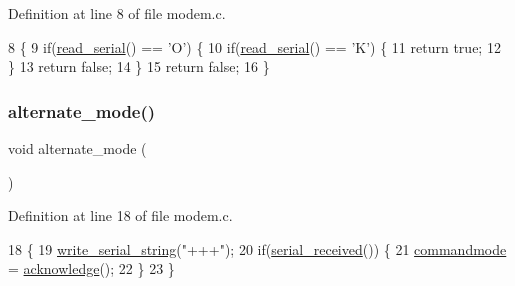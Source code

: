 Definition at line 8 of file modem.\+c.


\begin{DoxyCode}
8                    \{
9     \textcolor{keywordflow}{if}(\hyperlink{a00050_ad343a7018f74662f794968dfa0523841_ad343a7018f74662f794968dfa0523841}{read\_serial}() == \textcolor{charliteral}{'O'}) \{
10         \textcolor{keywordflow}{if}(\hyperlink{a00050_ad343a7018f74662f794968dfa0523841_ad343a7018f74662f794968dfa0523841}{read\_serial}() == \textcolor{charliteral}{'K'}) \{
11             \textcolor{keywordflow}{return} \textcolor{keyword}{true};
12         \}
13         \textcolor{keywordflow}{return} \textcolor{keyword}{false};
14     \}
15     \textcolor{keywordflow}{return} \textcolor{keyword}{false};
16 \}
\end{DoxyCode}
\mbox{\label{a00041_ace378eaa88c0b7f0cdafe97d064e36fb_ace378eaa88c0b7f0cdafe97d064e36fb}} 
\subsubsection{\texorpdfstring{alternate\+\_\+mode()}{alternate\_mode()}}
{\footnotesize\ttfamily void alternate\+\_\+mode (\begin{DoxyParamCaption}{ }\end{DoxyParamCaption})}



Definition at line 18 of file modem.\+c.


\begin{DoxyCode}
18                       \{
19     \hyperlink{a00050_aabbe45d6670f606c53ba38a5fb14b650_aabbe45d6670f606c53ba38a5fb14b650}{write\_serial\_string}(\textcolor{stringliteral}{"+++"});
20     \textcolor{keywordflow}{if}(\hyperlink{a00050_af10f0e64ba89e8635aa7245ca08297c5_af10f0e64ba89e8635aa7245ca08297c5}{serial\_received}()) \{
21         \hyperlink{a00038_aaf612f2f6c2c9931ab63296b3514a037_aaf612f2f6c2c9931ab63296b3514a037}{commandmode} = \hyperlink{a00038_a8529dba543149138317e327931bf5a5c_a8529dba543149138317e327931bf5a5c}{acknowledge}();
22     \}
23 \}
\end{DoxyCode}
\mbox{\label{a00041_a5e56e19ccc8f36690d515dd09948db10_a5e56e19ccc8f36690d515dd09948db10}} 
